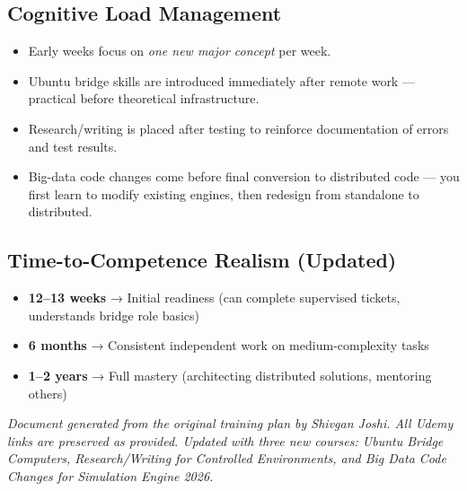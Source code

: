 \documentclass[12pt]{article}
\begin{document}
	\subsection*{Cognitive Load Management}
	\begin{itemize}
		\item Early weeks focus on \emph{one new major concept} per week.
		\item Ubuntu bridge skills are introduced immediately after remote work — practical before theoretical infrastructure.
		\item Research/writing is placed after testing to reinforce documentation of errors and test results.
		\item Big-data code changes come before final conversion to distributed code — you first learn to modify existing engines, then redesign from standalone to distributed.
	\end{itemize}
	
	\subsection*{Time-to-Competence Realism (Updated)}
	\begin{itemize}
		\item \textbf{12–13 weeks} → Initial readiness (can complete supervised tickets, understands bridge role basics)
		\item \textbf{6 months} → Consistent independent work on medium‑complexity tasks
		\item \textbf{1–2 years} → Full mastery (architecting distributed solutions, mentoring others)
	\end{itemize}
	
	\vspace{1cm}
	\noindent\textit{Document generated from the original training plan by Shivgan Joshi. All Udemy links are preserved as provided. Updated with three new courses: Ubuntu Bridge Computers, Research/Writing for Controlled Environments, and Big Data Code Changes for Simulation Engine 2026.}
	
\end{document}
